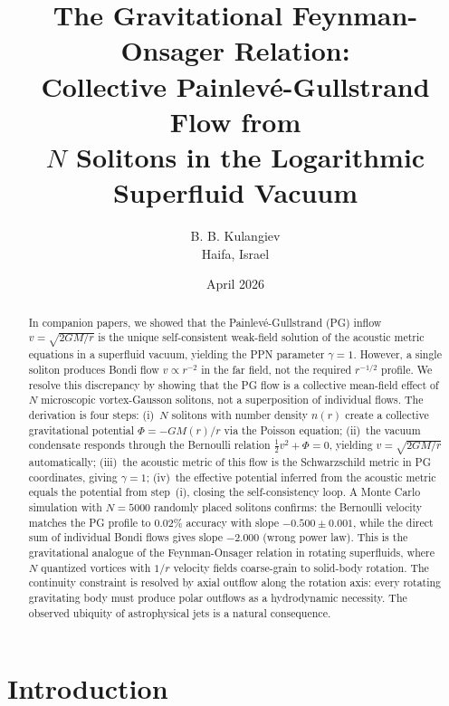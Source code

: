 \documentclass[12pt, a4paper]{article}
\begin{document}
\title{The Gravitational Feynman-Onsager Relation:\\
Collective Painlev\'{e}-Gullstrand Flow from\\
$N$ Solitons in the Logarithmic Superfluid Vacuum}

\author{B. B. Kulangiev\\\small{Haifa, Israel}}
\date{April 2026}
\maketitle

\begin{abstract}
\noindent
In companion papers, we showed that the
Painlev\'{e}-Gullstrand (PG) inflow
$v = \sqrt{2GM/r}$ is the unique self-consistent
weak-field solution of the acoustic metric equations
in a superfluid vacuum, yielding the PPN parameter
$\gamma = 1$. However, a single soliton produces
Bondi flow $v \propto r^{-2}$ in the far field, not
the required $r^{-1/2}$ profile. We resolve this
discrepancy by showing that the PG flow is a
collective mean-field effect of $N$ microscopic
vortex-Gausson solitons, not a superposition of
individual flows. The derivation is four steps:
(i)~$N$ solitons with number density $n(r)$ create a
collective gravitational potential
$\Phi = -GM(r)/r$ via the Poisson equation;
(ii)~the vacuum condensate responds through the
Bernoulli relation $\tfrac{1}{2}v^2 + \Phi = 0$,
yielding $v = \sqrt{2GM/r}$ automatically;
(iii)~the acoustic metric of this flow is the
Schwarzschild metric in PG coordinates, giving
$\gamma = 1$;
(iv)~the effective potential inferred from the
acoustic metric equals the potential from step~(i),
closing the self-consistency loop. A Monte Carlo
simulation with $N = 5000$ randomly placed solitons
confirms: the Bernoulli velocity matches the PG
profile to $0.02\%$ accuracy with slope
$-0.500 \pm 0.001$, while the direct sum of
individual Bondi flows gives slope $-2.000$
(wrong power law). This is the gravitational
analogue of the Feynman-Onsager relation in rotating
superfluids, where $N$ quantized vortices with
$1/r$ velocity fields coarse-grain to solid-body
rotation. The continuity constraint is resolved by
axial outflow along the rotation axis: every
rotating gravitating body must produce polar
outflows as a hydrodynamic necessity. The observed
ubiquity of astrophysical jets is a natural
consequence.
\end{abstract}


\section{Introduction}
\label{sec:intro}
\end{document}
